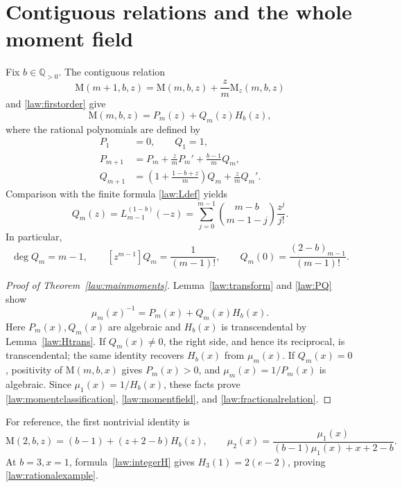 \documentclass[11pt,a4paper]{article}
\newcommand{\Q}{\mathbb Q}
\newcommand{\M}{\mathrm M}
\theoremstyle{definition}
\theoremstyle{remark}
\numberwithin{equation}{section}
\begin{document}
\section{Contiguous relations and the whole moment field}

Fix $b\in\Q_{>0}$. The contiguous relation
\begin{equation}\label{law:contiguous}
 \M(m+1,b,z)=\M(m,b,z)+\frac zm\M_z(m,b,z)
\end{equation}
and \eqref{law:firstorder} give
\begin{equation}\label{law:PQ}
 \M(m,b,z)=P_m(z)+Q_m(z)H_b(z),
\end{equation}
where the rational polynomials are defined by
\begin{align}
 P_1&=0,\qquad Q_1=1,\label{law:PQbase}\\
 P_{m+1}&=P_m+\frac zmP_m'+\frac{b-1}{m}Q_m,\label{law:Prec}\\
 Q_{m+1}&=\left(1+\frac{1-b+z}{m}\right)Q_m+\frac zmQ_m'.
 \label{law:Qrec}
\end{align}
Comparison with the finite formula \eqref{law:Ldef} yields
\begin{equation}\label{law:Qexplicit}
 Q_m(z)=L_{m-1}^{(1-b)}(-z)
 =\sum_{j=0}^{m-1}\binom{m-b}{m-1-j}\frac{z^j}{j!}.
\end{equation}
In particular,
\begin{equation}\label{law:Qleading}
 \deg Q_m=m-1,\qquad
 [z^{m-1}]Q_m=\frac1{(m-1)!},\qquad
 Q_m(0)=\frac{(2-b)_{m-1}}{(m-1)!}.
\end{equation}

\begin{proof}[Proof of Theorem~\ref{law:mainmoments}]
Lemma~\ref{law:transform} and \eqref{law:PQ} show
\[
 \mu_m(x)^{-1}=P_m(x)+Q_m(x)H_b(x).
\]
Here $P_m(x),Q_m(x)$ are algebraic and $H_b(x)$ is transcendental
by Lemma~\ref{law:Htrans}. If $Q_m(x)\ne0$, the right side, and hence
its reciprocal, is transcendental; the same identity recovers $H_b(x)$
from $\mu_m(x)$. If $Q_m(x)=0$, positivity of $\M(m,b,x)$ gives
$P_m(x)>0$, and $\mu_m(x)=1/P_m(x)$ is algebraic.
Since $\mu_1(x)=1/H_b(x)$, these facts prove
\eqref{law:momentclassification}, \eqref{law:momentfield}, and
\eqref{law:fractionalrelation}.
\end{proof}

For reference, the first nontrivial identity is
\[
 \M(2,b,z)=(b-1)+(z+2-b)H_b(z),
 \qquad
 \mu_2(x)=\frac{\mu_1(x)}{(b-1)\mu_1(x)+x+2-b}.
\]
At $b=3,x=1$, formula~\eqref{law:integerH} gives
$H_3(1)=2(e-2)$, proving \eqref{law:rationalexample}.
\end{document}
